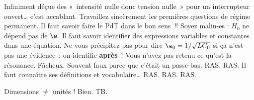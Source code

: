\documentclass[a4paper, 12pt, final, garamond]{book}
\begin{document}
\setcounter{section}{0}
\begin{enumerate}
	Infiniment déçue des «~intensité nulle donc tension nulle~» pour un
	interrupteur ouvert… c'est accablant. Travaillez sincèrement les premières
	questions de régime permanent.
	Il faut savoir faire le PdT dans le bon sens~!!
	Soyez malin-es : $H_0$ ne dépend pas de $\w$. Il faut savoir identifier des
	expressions variables et constantes dans une équation. Ne vous précipitez pas
	pour dire $\w_0 = 1/\sqrt{LC_0}$ si ça n'est pas une évidence~: on identifie
	\textbf{après}~!
	Vous n'avez pas retenu ce qu'est la résonance. Fâcheux.
	Souvent faux parce que c'était un passe-bas.
	RAS.
	RAS.
	Il faut connaître ses définitions et vocabulaire…
	RAS.
	RAS.
	RAS.
\end{enumerate}

\begin{enumerate}
	Dimensions $\neq $ unités !
	Bien.
	TB.
\end{enumerate}
\end{document}
